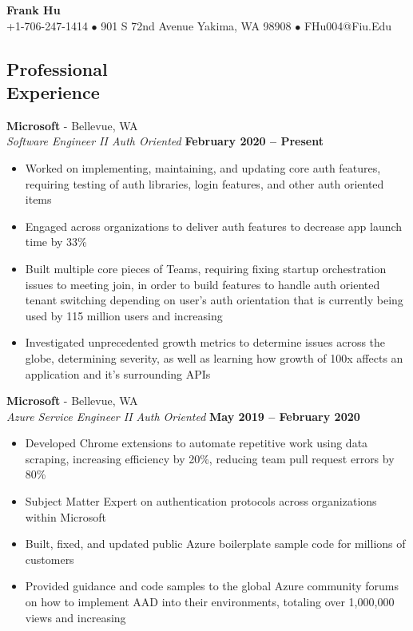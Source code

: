 \documentclass[margin,line]{resume}
\begin{document}
	{\centering \LARGE{\textbf{Frank Hu}}}
	\\
	\normalsize
	+1-706-247-1414 $\bullet$ 901 S 72nd Avenue Yakima, WA 98908 $\bullet$ FHu004@Fiu.Edu
	
	\begin{resume}	
		
	
	\section{\mysidestyle Professional\\Experience}
	
	
	\textbf{Microsoft} - Bellevue, WA \vspace{1mm}\\\vspace{1mm}
	\textsl{Software Engineer II Auth Oriented} \hfill \textbf{February 2020  -- Present}
	\begin{itemize}
		\item Worked on implementing, maintaining, and updating core auth features, requiring testing of auth libraries, login features, and other auth oriented items
		\item Engaged across organizations to deliver auth features to decrease app launch time by 33\%
		\item Built multiple core pieces of Teams, requiring fixing startup orchestration issues to meeting join, in order to build features to handle auth oriented tenant switching depending on user's auth orientation that is currently being used by 115 million users and increasing
		\item Investigated unprecedented growth metrics to determine issues across the globe, determining severity, as well as learning how growth of 100x affects an application and it's surrounding APIs
	\end{itemize}
	
	\textbf{Microsoft} - Bellevue, WA \vspace{1mm}\\\vspace{1mm}
	\textsl{Azure Service Engineer II Auth Oriented} \hfill \textbf{May 2019 -- February 2020}
	\begin{itemize}
		\item Developed Chrome extensions to automate repetitive work using data scraping, increasing efficiency by 20\%, reducing team pull request errors by 80\%
		\item Subject Matter Expert on authentication protocols across organizations within Microsoft
		\item Built, fixed, and updated public Azure boilerplate sample code for millions of customers
		\item Provided guidance and code samples to the global Azure community forums on how to implement AAD  into their environments, totaling over 1,000,000 views and increasing
	\end{itemize}
		

\end{resume}
\end{document}
